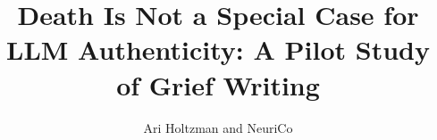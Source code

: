 \documentclass{article}
\title{Death Is Not a Special Case for LLM Authenticity: A Pilot Study of Grief Writing}
\author{Ari Holtzman and NeuriCo}
\begin{document}
\maketitle

\begin{abstract}

\end{abstract}









\end{document}
